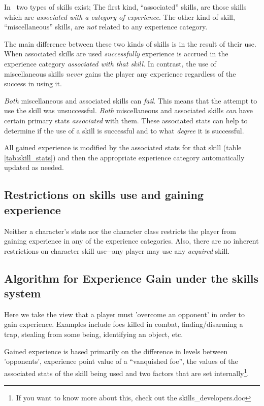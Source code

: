 In \cf\ two types of skills exist; The first kind, ``associated''
skills, are those skills which are {\em associated with a category of
experience}.  The other kind of skill, ``miscellaneous'' skills,
are {\em not} related to any experience category.

The main difference between these two kinds of skills is in the
result of their use.
When associated skills are used {\em successfully} experience is
accrued in the experience category {\em associated with that skill}.
In contrast, the use of miscellaneous skills {\em never} gains
the player any experience regardless of the success in using it.

{\em Both} miscellaneous and associated skills can {\em fail}. This means
that the attempt to use the skill was unsuccessful. {\em Both}
miscellaneous and associated skills {\em can} have certain
primary stats {\em associated} with them. These associated stats can help
to determine if the use of a skill is successful and to what
{\em degree} it is successful.

All gained experience is modified by the associated
stats for that skill (table \ref{tab:skill_stats}) and then the
appropriate experience category automatically updated as needed.

\subsection{Restrictions on skills use and gaining experience}

Neither a character's stats nor the character class restricts the
player from gaining experience in any of the experience
categories. Also, there are no inherent
restrictions on character skill use$-$any player may
use any {\em acquired} skill.

\subsection{Algorithm for Experience Gain under the skills system}

Here we take the view that a player must 'overcome an opponent'
in order to gain experience. Examples include foes killed in combat,
finding/disarming a trap, stealing from some being, identifying
an object, etc.

Gained experience is based primarily on the difference in levels
between 'opponents', experience point value of a ``vanquished foe'',
the values of the associated stats of the skill being used and
two factors that are set internally\footnote{If you want to
know more about this, check out the skills\_developers.doc}.

